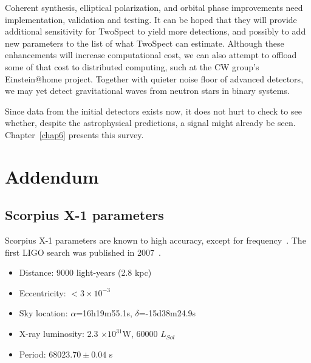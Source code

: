 Coherent synthesis, elliptical polarization, and orbital phase improvements
need implementation, validation and testing.
It can be hoped that they will provide additional sensitivity for TwoSpect to yield more detections, and possibly to add new parameters to the list of what TwoSpect can estimate.
Although these enhancements will increase computational cost, we can also attempt to offload some of that cost to distributed computing, such at the CW group's Einstein@home project.
Together with quieter noise floor of advanced detectors, we may yet detect gravitational waves from neutron stars in binary systems.

Since data from the initial detectors exists now, it does not hurt to check to see whether, despite the astrophysical predictions, a signal might already be seen.
Chapter~\ref{chap6} presents this survey.

\section{Addendum}
\label{chap5_addendum}


\subsection{Scorpius X-1 parameters}
\label{scox1_parameters}

Scorpius X-1 parameters are known to high accuracy, except for frequency~\cite{Galloway2014}.
The first LIGO search was published in 2007~\cite{AbbottScoX12007}.

\begin{itemize}
\item Distance: 9000 light-years (2.8 kpc)
\item Eccentricity: $<3\times10^{-3}$
\item Sky location: $\alpha$=16h19m55.1s, $\delta$=-15d38m24.9s
\item X-ray luminosity: 2.3 $\times10^{31}$W, 60000 $L_{Sol}$
\item Period: $68023.70 \pm 0.04$ s
\end{itemize}

